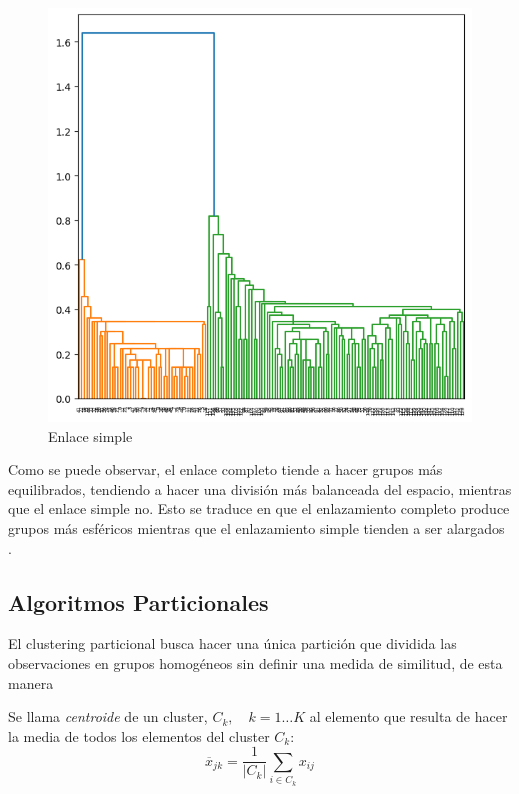 \begin{figure}[ht]
\begin{minipage}{0.4\textwidth}
    \includegraphics[width=\textwidth]{Documentos Extra/Imagenes/single_linkage.png}
    \caption{Enlace simple}
    \label{fig:imagen2}
  \end{minipage}
 \end{figure}

\noindent Como se puede observar, el enlace completo tiende a hacer grupos más equilibrados, tendiendo a hacer una división más balanceada del espacio, mientras que el enlace simple no. Esto se traduce en que el enlazamiento completo produce grupos más esféricos mientras que el enlazamiento simple tienden a ser alargados \cite{Peña 2002}. 

\subsection{Algoritmos Particionales}

\noindent El clustering particional busca hacer una única partición que dividida las observaciones en grupos homogéneos sin definir una medida de similitud, de esta manera 

\begin{defi}
Se llama \emph{centroide} de un cluster, $C_k,\quad k=1\ldots K$ al elemento que resulta de hacer la media de todos los elementos del cluster $C_k$:
\begin{equation}
\overline{x}_{jk}=\dfrac{1}{|C_k|}\sum_{i\in C_k} x_{ij}
\end{equation}
\end{defi}

